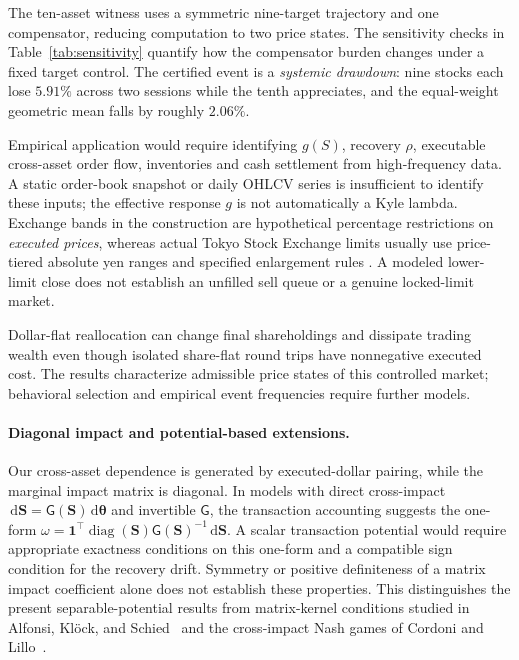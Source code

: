 \documentclass[11pt]{article}
\numberwithin{equation}{section}
\theoremstyle{definition}
\theoremstyle{remark}
\newcommand{\dd}{\,\mathrm{d}}
\newcommand{\one}{\mathbf{1}}
\begin{document}
The ten-asset witness uses a symmetric nine-target trajectory and one compensator, reducing computation to two price states. The sensitivity checks in Table~\ref{tab:sensitivity} quantify how the compensator burden changes under a fixed target control. The certified event is a \emph{systemic drawdown}: nine stocks each lose $5.91\%$ across two sessions while the tenth appreciates, and the equal-weight geometric mean falls by roughly $2.06\%$.

Empirical application would require identifying $g(S)$, recovery $\rho$, executable cross-asset order flow, inventories and cash settlement from high-frequency data. A static order-book snapshot or daily OHLCV series is insufficient to identify these inputs; the effective response $g$ is not automatically a Kyle lambda. Exchange bands in the construction are hypothetical percentage restrictions on \emph{executed prices}, whereas actual Tokyo Stock Exchange limits usually use price-tiered absolute yen ranges and specified enlargement rules \citep{JPX2026}. A modeled lower-limit close does not establish an unfilled sell queue or a genuine locked-limit market.

Dollar-flat reallocation can change final shareholdings and dissipate trading wealth even though isolated share-flat round trips have nonnegative executed cost. The results characterize admissible price states of this controlled market; behavioral selection and empirical event frequencies require further models.

\paragraph{Diagonal impact and potential-based extensions.}
Our cross-asset dependence is generated by executed-dollar pairing, while the marginal impact matrix is diagonal. In models with direct cross-impact $\dd\bm S=\mathsf G(\bm S)\dd\bm\theta$ and invertible $\mathsf G$, the transaction accounting suggests the one-form $\omega=\one^\top\operatorname{diag}(\bm S)\mathsf G(\bm S)^{-1}\dd\bm S$. A scalar transaction potential would require appropriate exactness conditions on this one-form and a compatible sign condition for the recovery drift. Symmetry or positive definiteness of a matrix impact coefficient alone does not establish these properties. This distinguishes the present separable-potential results from matrix-kernel conditions studied in Alfonsi, Kl\"ock, and Schied~\citep{AlfonsiKlockSchied2016} and the cross-impact Nash games of Cordoni and Lillo~\citep{CordoniLillo2024}.
\end{document}
